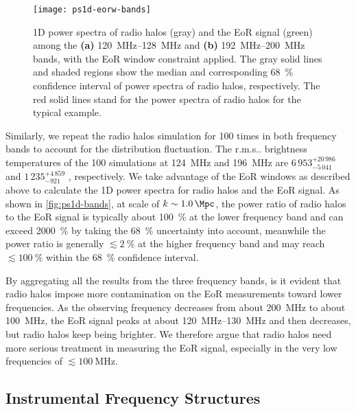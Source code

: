 \documentclass[modern]{aastex62}
\makeatletter
\newcommand{\rms}{r.m.s\@ifnextchar.{}{.\@}}
\makeatother
\begin{document}
\begin{figure}
  \centering
  \texttt{[image: ps1d-eorw-bands]}
  \caption{\label{fig:ps1d-bands}%
    1D power spectra of radio halos (gray) and the EoR signal (green)
    among the
    \textbf{(a)} \SIrange{120}{128}{\MHz} and
    \textbf{(b)} \SIrange{192}{200}{\MHz} bands,
    with the EoR window constraint applied.
    The gray solid lines and shaded regions show the median and
    corresponding \SI{68}{\percent} confidence interval of power spectra
    of radio halos, respectively.
    The red solid lines stand for the power spectra of radio halos for
    the typical example.
  }
\end{figure}

Similarly, we repeat the radio halos simulation for 100 times in both
frequency bands to account for the distribution fluctuation.
The \rms{} brightness temperatures of the 100 simulations at
\SI{124}{\MHz} and \SI{196}{\MHz} are $6\,953_{-5\,041}^{+20\,986}$ \si{\mK}
and $1\,235_{-921}^{+4\,859}$ \si{\mK}, respectively.
We take advantage of the EoR windows as described above to calculate the
1D power spectra for radio halos and the EoR signal.
As shown in \autoref{fig:ps1d-bands}, at scale of $k \sim \SI{1.0}{\per\Mpc}$,
the power ratio of radio halos to the EoR signal is typically about
\SI{100}{\percent} at the lower frequency band and can exceed
\SI{2000}{\percent} by taking the \SI{68}{\percent} uncertainty into
account,
meanwhile the power ratio is generally $\lesssim \SI{2}{\percent}$ at
the higher frequency band and may reach $\lesssim \SI{100}{\percent}$
within the \SI{68}{\percent} confidence interval.

By aggregating all the results from the three frequency bands, is it
evident that radio halos impose more contamination on the EoR measurements
toward lower frequencies.
As the observing frequency decreases from about \SI{200}{\MHz} to about
\SI{100}{\MHz}, the EoR signal peaks at about \SIrange{120}{130}{\MHz}
\citep{mesinger2016} and then decreases, but radio halos keep being
brighter.
We therefore argue that radio halos need more serious treatment in
measuring the EoR signal, especially in the very low frequencies of
$\lesssim \SI{100}{\MHz}$.

\subsection{Instrumental Frequency Structures}
\label{sec:freq-structures}
\end{document}
